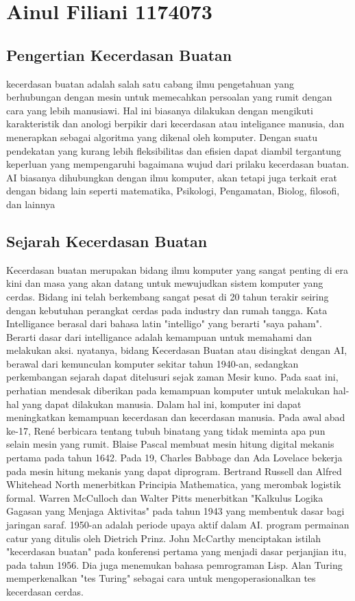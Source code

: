 \section{Ainul Filiani 1174073}
\subsection{Pengertian Kecerdasan Buatan}
kecerdasan buatan adalah salah satu cabang ilmu pengetahuan yang berhubungan dengan mesin untuk memecahkan persoalan yang rumit dengan cara yang lebih manusiawi. Hal ini biasanya dilakukan dengan mengikuti karakteristik dan anologi berpikir dari kecerdasan  atau inteligance manusia, dan menerapkan sebagai algoritma yang dikenal oleh komputer.
Dengan suatu pendekatan yang kurang lebih fleksibilitas dan efisien dapat diambil tergantung keperluan yang mempengaruhi bagaimana wujud dari prilaku kecerdasan buatan. AI biasanya dihubungkan dengan ilmu komputer, akan tetapi juga terkait erat dengan bidang lain seperti matematika, Psikologi, Pengamatan, Biolog, filosofi, dan lainnya
\subsection{Sejarah Kecerdasan Buatan}
Kecerdasan buatan merupakan bidang ilmu komputer yang sangat penting di era kini dan masa yang akan datang untuk mewujudkan sistem komputer yang cerdas. Bidang ini telah berkembang sangat pesat di 20 tahun terakir seiring dengan kebutuhan perangkat cerdas pada industry dan rumah tangga.
Kata Intelligance berasal dari bahasa latin "intelligo" yang berarti "saya paham". Berarti dasar dari intelligance adalah kemampuan untuk memahami dan melakukan aksi. nyatanya, bidang Kecerdasan Buatan atau disingkat dengan AI, berawal dari kemunculan komputer sekitar tahun 1940-an, sedangkan perkembangan sejarah dapat ditelusuri sejak zaman Mesir kuno. Pada saat ini, perhatian mendesak diberikan pada kemampuan komputer untuk melakukan hal-hal yang dapat dilakukan manusia. Dalam hal ini, komputer ini dapat meningkatkan kemampuan kecerdasan dan kecerdasan manusia.
Pada awal abad ke-17, René berbicara tentang tubuh binatang yang tidak meminta apa pun selain mesin yang rumit. Blaise Pascal membuat mesin hitung digital mekanis pertama pada tahun 1642. Pada 19, Charles Babbage dan Ada Lovelace bekerja pada mesin hitung mekanis yang dapat diprogram. Bertrand Russell dan Alfred Whitehead North menerbitkan Principia Mathematica, yang merombak logistik formal. Warren McCulloch dan Walter Pitts menerbitkan "Kalkulus Logika Gagasan yang Menjaga Aktivitas" pada tahun 1943 yang membentuk dasar bagi jaringan saraf.
1950-an adalah periode upaya aktif dalam AI. program permainan catur yang ditulis oleh Dietrich Prinz. John McCarthy menciptakan istilah "kecerdasan buatan" pada konferensi pertama yang menjadi dasar perjanjian itu, pada tahun 1956. Dia juga menemukan bahasa pemrograman Lisp. Alan Turing memperkenalkan "tes Turing" sebagai cara untuk mengoperasionalkan tes kecerdasan cerdas. 

